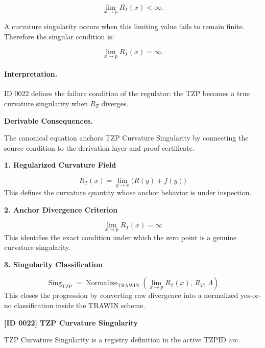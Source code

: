\begin{equation}
\lim_{x\to p}R_T(x)<\infty .
\end{equation}

A curvature singularity occurs when this limiting value fails to remain finite. Therefore the singular condition is:

\begin{equation}
\boxed{
\lim_{x\to p}R_T(x)=\infty .
}
\end{equation}

\paragraph{Interpretation.}
ID 0022 defines the failure condition of the regulator: the TZP becomes a true curvature singularity when $R_T$ diverges.

\par\vspace{0.35em}
\noindent\textbf{Derivable Consequences.}\quad
\begingroup
\footnotesize
\raggedright
The canonical equation anchors TZP Curvature Singularity by connecting the source condition to the derivation layer and proof certificate.
\par\endgroup

\noindent\textbf{1. Regularized Curvature Field}\par
\[
R_{T}(x)=\lim_{y\to x}\bigl(R(y)+f(y)\bigr)
\]
\noindent This defines the curvature quantity whose anchor behavior is under inspection.\par
\noindent\textbf{2. Anchor Divergence Criterion}\par
\[
\lim_{x\to p} R_{T}(x) = \infty
\]
\noindent This identifies the exact condition under which the zero point is a genuine curvature singularity.\par
\noindent\textbf{3. Singularity Classification}\par
\[
\operatorname{Sing}_{\mathrm{TZP}}
=
\operatorname{Normalize}_{\mathrm{TRAWIN}}
\!\left(
\lim_{x\to p}R_{T}(x),\,
R_{T},\,
\Lambda
\right)
\]
\noindent This closes the progression by converting raw divergence into a normalized yes-or-no classification inside the TRAWIN scheme.\par

\clearpage
\noindent\textbf{[ID 0022] TZP Curvature Singularity}\par
\vspace{0.35em}
\begingroup\small
{}
TZP Curvature Singularity is a registry definition in the active TZPID arc.

